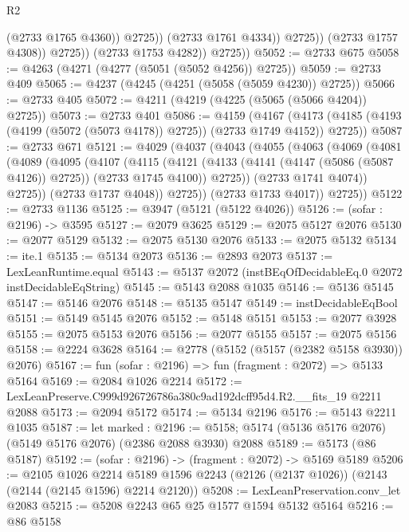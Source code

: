 \begin{lexlean}{R2}
\begin{coremodule}
                            (@2733 @1765 @4360))
                          @2725))
                      (@2733 @1761 @4334))
                    @2725))
                (@2733 @1757 @4308))
              @2725))
          (@2733 @1753 @4282))
        @2725))
@5052 := @2733 @675
@5058 := @4263 (@4271 (@4277 (@5051 (@5052 @4256)) @2725))
@5059 := @2733 @409
@5065 := @4237 (@4245 (@4251 (@5058 (@5059 @4230)) @2725))
@5066 := @2733 @405
@5072 := @4211 (@4219 (@4225 (@5065 (@5066 @4204)) @2725))
@5073 := @2733 @401
@5086 := @4159
    (@4167 (@4173 (@4185 (@4193 (@4199 (@5072 (@5073 @4178)) @2725)) (@2733 @1749 @4152)) @2725))
@5087 := @2733 @671
@5121 := @4029
    (@4037
      (@4043
        (@4055
          (@4063
            (@4069
              (@4081
                (@4089
                  (@4095
                    (@4107
                      (@4115
                        (@4121
                          (@4133 (@4141 (@4147 (@5086 (@5087 @4126)) @2725)) (@2733 @1745 @4100))
                          @2725))
                      (@2733 @1741 @4074))
                    @2725))
                (@2733 @1737 @4048))
              @2725))
          (@2733 @1733 @4017))
        @2725))
@5122 := @2733 @1136
@5125 := @3947 (@5121 (@5122 @4026))
@5126 := (sofar : @2196) -> @3595
@5127 := @2079 @3625
@5129 := @2075 @5127 @2076
@5130 := @2077 @5129
@5132 := @2075 @5130 @2076
@5133 := @2075 @5132
@5134 := ite.{1}
@5135 := @5134 @2073
@5136 := @2893 @2073
@5137 := LexLeanRuntime.equal
@5143 := @5137 @2072 (instBEqOfDecidableEq.{0} @2072 instDecidableEqString)
@5145 := @5143 @2088 @1035
@5146 := @5136 @5145
@5147 := @5146 @2076
@5148 := @5135 @5147
@5149 := instDecidableEqBool
@5151 := @5149 @5145 @2076
@5152 := @5148 @5151
@5153 := @2077 @3928
@5155 := @2075 @5153 @2076
@5156 := @2077 @5155
@5157 := @2075 @5156
@5158 := @2224 @3628
@5164 := @2778 (@5152 (@5157 (@2382 @5158 @3930)) @2076)
@5167 := fun (sofar : @2196) => fun (fragment : @2072) => @5133 @5164
@5169 := @2084 @1026 @2214
@5172 := LexLeanPreserve.C999d926726786a380c9ad192dcff95d4.R2.__fits_19 @2211 @2088
@5173 := @2094 @5172
@5174 := @5134 @2196
@5176 := @5143 @2211 @1035
@5187 := let marked : @2196 := @5158;
  @5174 (@5136 @5176 @2076) (@5149 @5176 @2076) (@2386 @2088 @3930) @2088
@5189 := @5173 (@86 @5187)
@5192 := (sofar : @2196) -> (fragment : @2072) -> @5169 @5189
@5206 := @2105
    @1026
    @2214
    @5189
    @1596
    @2243
    (@2126 (@2137 @1026))
    (@2143 (@2144 (@2145 @1596) @2214 @2120))
@5208 := LexLeanPreservation.conv_let @2083
@5215 := @5208 @2243 @65 @25 @1577 @1594 @5132 @5164
@5216 := @86 @5158

\end{coremodule}
\end{lexlean}
